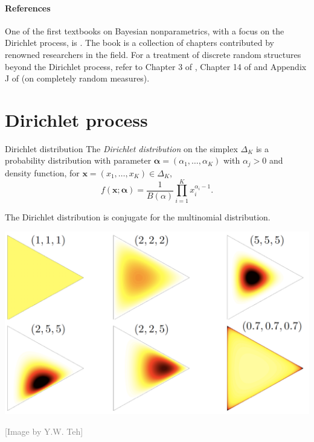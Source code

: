 
\paragraph{References}

One of the first textbooks on Bayesian nonparametrics, with a focus on the Dirichlet process, is \citet{Ghosh2003}. The book \citet{hjort2010bayesian} is a collection of chapters contributed by renowned researchers in the field. For a treatment of discrete random structures beyond the Dirichlet process, refer to Chapter 3 of \citet{hjort2010bayesian}, Chapter 14 of \citet{ghosal2017fundamentals} and Appendix J of \citet{ghosal2017fundamentals} (on completely random measures).

\section{Dirichlet process}

\begin{definition}{Dirichlet distribution}
		The \textit{Dirichlet distribution} on the simplex $\Delta_K$ is a probability distribution with parameter $\boldsymbol{\alpha} = (\alpha_1,\ldots,\alpha_K)$ with $\alpha_j>0$ and density function, for $\boldsymbol{x} = (x_1, \ldots, x_K)\in \Delta_K$,
\begin{equation*}
	f(\boldsymbol{x}; \boldsymbol{\alpha}) = \frac{1}{B(\alpha)}\prod_{i=1}^Kx_i^{\alpha_i - 1}.
\end{equation*}
\end{definition}

The Dirichlet distribution is conjugate for the multinomial distribution. 

\begin{center}
\includegraphics[width = .6\textwidth]{figures_julyan/intro_DP/dirichlet_distribution}
\end{center}
\hfill\textcolor{gray}{[Image by Y.W. Teh]}



